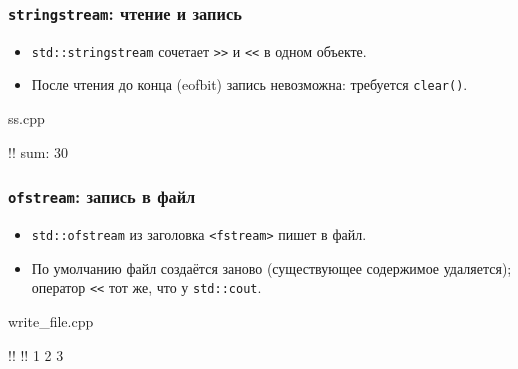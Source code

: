 \documentclass[compress, 8pt, aspectratio=169]{beamer}
\begin{document}
  \begin{frame}[fragile]

    \frametitle{\texttt{stringstream}: чтение и запись}

    \begin{itemize}

      \item \texttt{std::stringstream} сочетает \texttt{>>}
        и \texttt{<<} в одном объекте.

      \item После чтения до конца (eofbit) запись невозможна:
        требуется \texttt{clear()}.

    \end{itemize}

        {ss.cpp}

    \begin{terminalwindow17}
!!
sum: 30
    \end{terminalwindow17}

  \end{frame}

  \begin{frame}[fragile]

    \frametitle{\texttt{ofstream}: запись в файл}

    \begin{itemize}

      \item \texttt{std::ofstream} из заголовка
        \texttt{<fstream>} пишет в файл.

      \item По умолчанию файл создаётся заново (существующее
        содержимое удаляется); оператор \texttt{<<} тот же,
        что у \texttt{std::cout}.

    \end{itemize}

        {write_file.cpp}

    \begin{terminalwindow17}
!!
!!
1 2 3
    \end{terminalwindow17}

  \end{frame}
\end{document}

